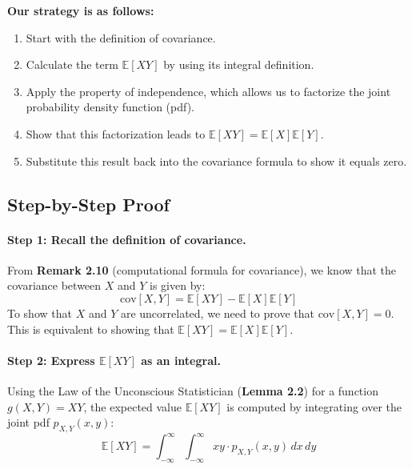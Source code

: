 \documentclass[11pt,a4paper]{article}
\begin{document}
\textbf{Our strategy is as follows:}
\begin{enumerate}
    \item Start with the definition of covariance.
    \item Calculate the term $\mathbb{E}[XY]$ by using its integral definition.
    \item Apply the property of independence, which allows us to factorize the joint probability density function (pdf).
    \item Show that this factorization leads to $\mathbb{E}[XY] = \mathbb{E}[X]\mathbb{E}[Y]$.
    \item Substitute this result back into the covariance formula to show it equals zero.
\end{enumerate}

\subsection{Step-by-Step Proof}

\paragraph{Step 1: Recall the definition of covariance.}
From \textbf{Remark 2.10} (computational formula for covariance), we know that the covariance between $X$ and $Y$ is given by:
\begin{equation}
    \text{cov}[X, Y] = \mathbb{E}[XY] - \mathbb{E}[X]\mathbb{E}[Y]
    \label{eq:cov}
\end{equation}
To show that $X$ and $Y$ are uncorrelated, we need to prove that $\text{cov}[X, Y] = 0$. This is equivalent to showing that $\mathbb{E}[XY] = \mathbb{E}[X]\mathbb{E}[Y]$.

\paragraph{Step 2: Express $\mathbb{E}[XY]$ as an integral.}
Using the Law of the Unconscious Statistician (\textbf{Lemma 2.2}) for a function $g(X,Y) = XY$, the expected value $\mathbb{E}[XY]$ is computed by integrating over the joint pdf $p_{X,Y}(x,y)$:
\begin{equation}
    \mathbb{E}[XY] = \int_{-\infty}^{\infty} \int_{-\infty}^{\infty} xy \cdot p_{X,Y}(x,y) \,dx\,dy
    \label{eq:exy_integral}
\end{equation}
\end{document}
